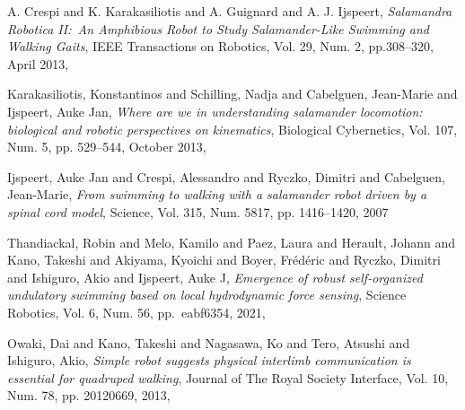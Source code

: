 \documentclass{cmc}
\begin{document}



% 

\begin{thebibliography}{9}

  A. Crespi and K. Karakasiliotis and A. Guignard and A. J. Ijspeert,
  \emph{Salamandra Robotica II:\ An Amphibious Robot to Study Salamander-Like Swimming and Walking Gaits},
  IEEE Transactions on Robotics, Vol. 29, Num. 2, pp.308--320, April 2013,

  Karakasiliotis, Konstantinos and Schilling, Nadja and Cabelguen, Jean-Marie and Ijspeert, Auke Jan,
  \emph{Where are we in understanding salamander locomotion: biological and robotic perspectives on kinematics},
  Biological Cybernetics, Vol. 107, Num. 5, pp. 529--544, October 2013,

  Ijspeert, Auke Jan and Crespi, Alessandro and Ryczko, Dimitri and Cabelguen, Jean-Marie,
  \emph{From swimming to walking with a salamander robot driven by a spinal cord model},
  Science, Vol. 315, Num. 5817, pp. 1416--1420, 2007

  Thandiackal, Robin and Melo, Kamilo and Paez, Laura and Herault, Johann and Kano, Takeshi and Akiyama, Kyoichi and Boyer, Fr{\'e}d{\'e}ric and Ryczko, Dimitri and Ishiguro, Akio and Ijspeert, Auke J,
  \emph{Emergence of robust self-organized undulatory swimming based on local hydrodynamic force sensing},
  Science Robotics, Vol. 6, Num. 56, pp.\ eabf6354, 2021,

  Owaki, Dai and Kano, Takeshi and Nagasawa, Ko and Tero, Atsushi and Ishiguro, Akio,
  \emph{Simple robot suggests physical interlimb communication is essential for quadruped walking},
  Journal of The Royal Society Interface, Vol. 10, Num. 78, pp. 20120669, 2013,

\end{thebibliography}


\end{document}
